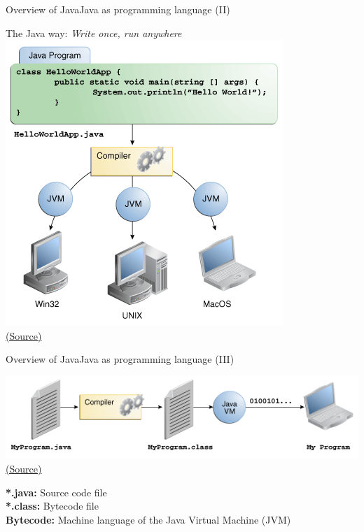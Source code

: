\documentclass[10pt,compress]{beamer} %
\begin{document}
\begin{frame}{Overview of Java}{Java as programming language (II)}
	\begin{center}
	The Java way: \textit{Write once, run anywhere}\\
	\smallskip
	\includegraphics[width=0.5\linewidth]{figs/helloWorld}\\
	\scriptsize{\href{http://docs.oracle.com/javase/tutorial/getStarted/intro/definition.html}{(Source)}}
	\end{center}
\end{frame}

\begin{frame}{Overview of Java}{Java as programming language (III)}
	\begin{center}
	\includegraphics[width=\linewidth]{figs/getStarted-compiler}\\
	\scriptsize{\href{http://docs.oracle.com/javase/tutorial/getStarted/intro/definition.html}{(Source)}}
	\end{center}
	\bigskip

	\normalsize{\textbf{*.java:} Source code file}\\
	\normalsize{\textbf{*.class:} Bytecode file}\\
	\normalsize{\textbf{Bytecode:} Machine language of the Java Virtual Machine (JVM)}
\end{frame}
\end{document}

